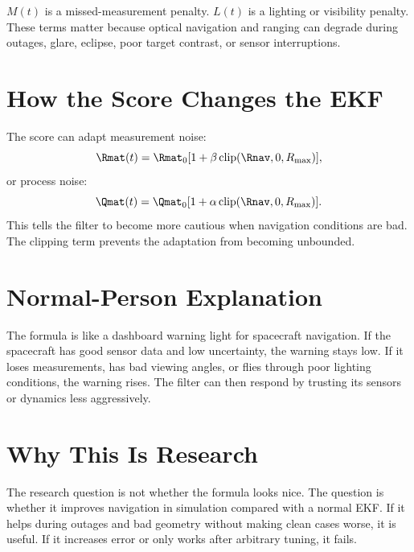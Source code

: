 \documentclass[11pt]{article}
\begin{document}
$M(t)$ is a missed-measurement penalty. $L(t)$ is a lighting or visibility
penalty. These terms matter because optical navigation and ranging can degrade
during outages, glare, eclipse, poor target contrast, or sensor interruptions.

\section{How the Score Changes the EKF}

The score can adapt measurement noise:
\begin{equation}
  \Rmat(t)=\Rmat_0[1+\beta\,\mathrm{clip}(\Rnav,0,R_{\max})],
\end{equation}
or process noise:
\begin{equation}
  \Qmat(t)=\Qmat_0[1+\alpha\,\mathrm{clip}(\Rnav,0,R_{\max})].
\end{equation}
This tells the filter to become more cautious when navigation conditions are
bad. The clipping term prevents the adaptation from becoming unbounded.

\section{Normal-Person Explanation}

The formula is like a dashboard warning light for spacecraft navigation. If
the spacecraft has good sensor data and low uncertainty, the warning stays low.
If it loses measurements, has bad viewing angles, or flies through poor
lighting conditions, the warning rises. The filter can then respond by trusting
its sensors or dynamics less aggressively.

\section{Why This Is Research}

The research question is not whether the formula looks nice. The question is
whether it improves navigation in simulation compared with a normal EKF. If it
helps during outages and bad geometry without making clean cases worse, it is
useful. If it increases error or only works after arbitrary tuning, it fails.
\end{document}
